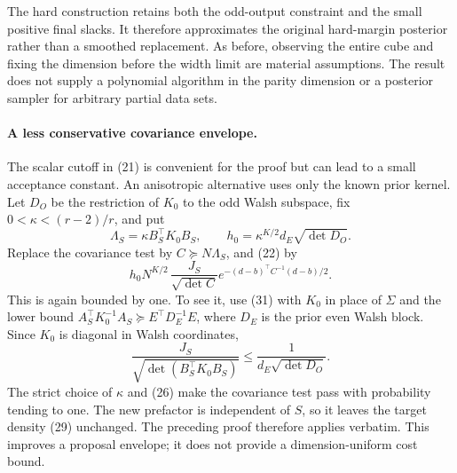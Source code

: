 The hard construction retains both the odd-output constraint and the
small positive final slacks. It therefore approximates the original
hard-margin posterior rather than a smoothed replacement. As before,
observing the entire cube and fixing the dimension before the width
limit are material assumptions. The result does not supply a polynomial
algorithm in the parity dimension or a posterior sampler for arbitrary
partial data sets.

\paragraph{A less conservative covariance envelope.}
The scalar cutoff in (21) is convenient for the proof but can lead to a
small acceptance constant. An anisotropic alternative uses only the
known prior kernel. Let $D_O$ be the restriction of $K_0$ to the odd
Walsh subspace, fix $0<\kappa<(r-2)/r$, and put
\[
 \Lambda_S=\kappa B_S^\top K_0B_S,\qquad
 h_0=\kappa^{K/2}d_E\sqrt{\det D_O}.
\]
Replace the covariance test by $C\succeq N\Lambda_S$, and (22) by
\[
 h_0 N^{K/2}\,\frac{J_S}{\sqrt{\det C}}
          e^{-(d-b)^\top C^{-1}(d-b)/2}.
\]
This is again bounded by one. To see it, use (31) with $K_0$ in place
of $\Sigma$ and the lower bound
$A_S^\top K_0^{-1}A_S\succeq E^\top D_E^{-1}E$, where $D_E$ is the
prior even Walsh block. Since $K_0$ is diagonal in Walsh coordinates,
\[
 \frac{J_S}{\sqrt{\det(B_S^\top K_0B_S)}}
       \le \frac1{d_E\sqrt{\det D_O}}.
\]
The strict choice of $\kappa$ and (26) make the covariance test pass
with probability tending to one. The new prefactor is independent of
$S$, so it leaves the target density (29) unchanged. The preceding proof
therefore applies verbatim. This improves a proposal envelope; it does
not provide a dimension-uniform cost bound.
